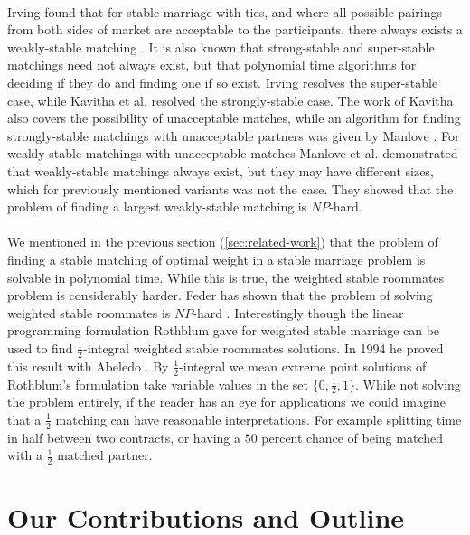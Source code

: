 \paragraph{}
Irving found that for stable marriage with ties, and where all possible pairings from both sides of market are acceptable to the participants, there always exists a weakly-stable matching \cite{irving1994stable}. It is also known that strong-stable and super-stable matchings need not always exist, but that polynomial time algorithms for deciding if they do and finding one if so exist. Irving resolves the super-stable case, while Kavitha et al. \cite{kavitha2004strongly} resolved the strongly-stable case. The work of Kavitha also covers the possibility of unacceptable matches, while an algorithm for finding strongly-stable matchings with unacceptable partners was given by Manlove \cite{manlove1999stable}. For weakly-stable matchings with unacceptable matches Manlove et al. \cite{manlove2002hard} demonstrated that weakly-stable matchings always exist, but they may have different sizes, which for previously mentioned variants was not the case. They showed that the problem of finding a largest weakly-stable matching is $NP$-hard.

\paragraph{}
We mentioned in the previous section (\ref{sec:related-work}) that the problem of finding a stable matching of optimal weight in a stable marriage problem is solvable in polynomial time. While this is true, the weighted stable roommates problem is considerably harder. Feder has shown that the problem of solving weighted stable roommates is $NP$-hard \cite{feder1992new}. Interestingly though the linear programming formulation Rothblum gave for weighted stable marriage can be used to find $\frac{1}{2}$-integral weighted stable roommates solutions. In 1994 he proved this result with Abeledo \cite{abeledo1994stable}. By $\frac{1}{2}$-integral we mean extreme point solutions of Rothblum's formulation take variable values in the set $\{0,\frac{1}{2},1\}$. While not solving the problem entirely, if the reader has an eye for applications we could imagine that a $\frac{1}{2}$ matching can have reasonable interpretations. For example splitting time in half between two contracts, or having a $50$ percent chance of being matched with a $\frac{1}{2}$ matched partner.

\section{Our Contributions and Outline}

